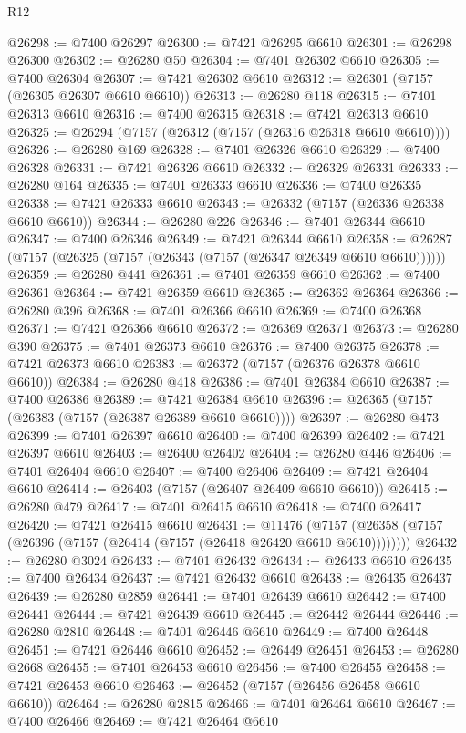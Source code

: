 \begin{lexlean}{R12}
\begin{coremodule}
{{{{{{{{{{{{{{{{{{{{{{{{{{{{{{{{{{{{{{{{{{{{{{{{{{{{{{{{{{{{{{{{{{{{{{{{{{{{{{{{{{@26298 := @7400 @26297
@26300 := @7421 @26295 @6610
@26301 := @26298 @26300
@26302 := @26280 @50
@26304 := @7401 @26302 @6610
@26305 := @7400 @26304
@26307 := @7421 @26302 @6610
@26312 := @26301 (@7157 (@26305 @26307 @6610 @6610))
@26313 := @26280 @118
@26315 := @7401 @26313 @6610
@26316 := @7400 @26315
@26318 := @7421 @26313 @6610
@26325 := @26294 (@7157 (@26312 (@7157 (@26316 @26318 @6610 @6610))))
@26326 := @26280 @169
@26328 := @7401 @26326 @6610
@26329 := @7400 @26328
@26331 := @7421 @26326 @6610
@26332 := @26329 @26331
@26333 := @26280 @164
@26335 := @7401 @26333 @6610
@26336 := @7400 @26335
@26338 := @7421 @26333 @6610
@26343 := @26332 (@7157 (@26336 @26338 @6610 @6610))
@26344 := @26280 @226
@26346 := @7401 @26344 @6610
@26347 := @7400 @26346
@26349 := @7421 @26344 @6610
@26358 := @26287 (@7157 (@26325 (@7157 (@26343 (@7157 (@26347 @26349 @6610 @6610))))))
@26359 := @26280 @441
@26361 := @7401 @26359 @6610
@26362 := @7400 @26361
@26364 := @7421 @26359 @6610
@26365 := @26362 @26364
@26366 := @26280 @396
@26368 := @7401 @26366 @6610
@26369 := @7400 @26368
@26371 := @7421 @26366 @6610
@26372 := @26369 @26371
@26373 := @26280 @390
@26375 := @7401 @26373 @6610
@26376 := @7400 @26375
@26378 := @7421 @26373 @6610
@26383 := @26372 (@7157 (@26376 @26378 @6610 @6610))
@26384 := @26280 @418
@26386 := @7401 @26384 @6610
@26387 := @7400 @26386
@26389 := @7421 @26384 @6610
@26396 := @26365 (@7157 (@26383 (@7157 (@26387 @26389 @6610 @6610))))
@26397 := @26280 @473
@26399 := @7401 @26397 @6610
@26400 := @7400 @26399
@26402 := @7421 @26397 @6610
@26403 := @26400 @26402
@26404 := @26280 @446
@26406 := @7401 @26404 @6610
@26407 := @7400 @26406
@26409 := @7421 @26404 @6610
@26414 := @26403 (@7157 (@26407 @26409 @6610 @6610))
@26415 := @26280 @479
@26417 := @7401 @26415 @6610
@26418 := @7400 @26417
@26420 := @7421 @26415 @6610
@26431 := @11476
    (@7157 (@26358 (@7157 (@26396 (@7157 (@26414 (@7157 (@26418 @26420 @6610 @6610))))))))
@26432 := @26280 @3024
@26433 := @7401 @26432
@26434 := @26433 @6610
@26435 := @7400 @26434
@26437 := @7421 @26432 @6610
@26438 := @26435 @26437
@26439 := @26280 @2859
@26441 := @7401 @26439 @6610
@26442 := @7400 @26441
@26444 := @7421 @26439 @6610
@26445 := @26442 @26444
@26446 := @26280 @2810
@26448 := @7401 @26446 @6610
@26449 := @7400 @26448
@26451 := @7421 @26446 @6610
@26452 := @26449 @26451
@26453 := @26280 @2668
@26455 := @7401 @26453 @6610
@26456 := @7400 @26455
@26458 := @7421 @26453 @6610
@26463 := @26452 (@7157 (@26456 @26458 @6610 @6610))
@26464 := @26280 @2815
@26466 := @7401 @26464 @6610
@26467 := @7400 @26466
@26469 := @7421 @26464 @6610
}}}}}}}}}}}}}}}}}}}}}}}}}}}}}}}}}}}}}}}}}}}}}}}}}}}}}}}}}}}}}}}}}}}}}}}}}}}}}}}}}}
\end{coremodule}
\end{lexlean}
